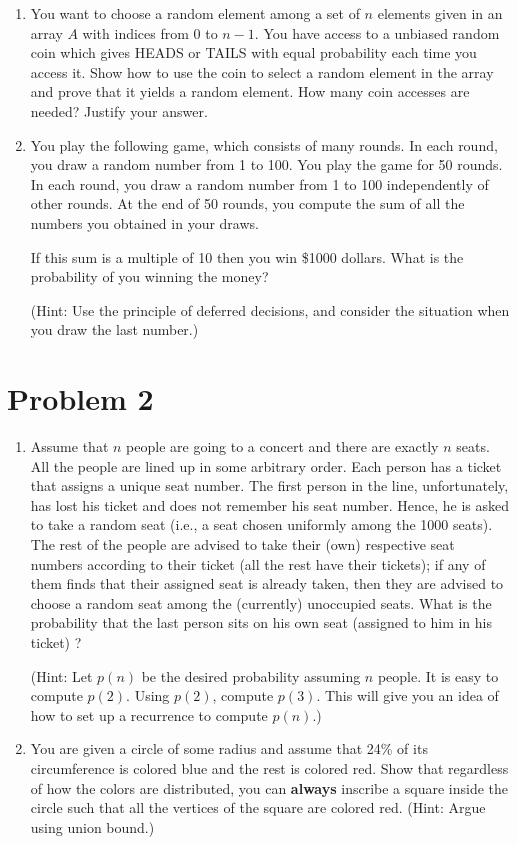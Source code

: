 \documentclass[11pt]{article}
\begin{document}
\begin{enumerate}
\item You want to choose a random element among a set of $n$  elements given in an array $A$ with indices from 
0 to $n-1$. You have access to a unbiased random coin which gives HEADS or TAILS with equal probability each time you access it. Show how to use the coin
to select a random element in the array and prove that it yields a random element. How many coin accesses are needed? Justify your answer. 
\item You play the following game, which consists of many rounds. In each round, you draw a random number from 1 to 100.  
You play the game for 50 rounds. In each round, you draw a random number from 1 to 100 independently of other rounds. 
At the end of 50 rounds, you compute the sum of all the numbers you obtained in your draws.  

If this sum is a multiple of 10 then you win \$1000 dollars.  What is the probability of you winning the money?

(Hint: Use the principle of deferred decisions, and consider the situation when you draw the last number.) 
\end{enumerate}


\section*{Problem 2} 

\begin{enumerate}
\item Assume that $n$ people are going to a concert and there are  exactly $n$ seats. 
All the people are lined up in some arbitrary order.  Each person has a ticket that assigns
a unique seat number.
The first person in the line, unfortunately, has lost his ticket and does not remember his seat number.
Hence, he is asked to take a random seat (i.e., a seat chosen uniformly
among the 1000 seats). The rest of the people are advised to take their (own) respective seat numbers according
to their ticket (all the rest have their tickets); if any of them finds that their assigned seat is already taken, then they are advised to choose a random seat among the (currently) unoccupied seats. What is the probability that
the last person sits on his own seat (assigned to him in his ticket) ?


(Hint: Let $p(n)$ be the desired probability assuming $n$ people. It is easy to compute $p(2)$. Using $p(2)$, compute $p(3)$. This will give you an idea of how to  set up a recurrence to compute $p(n)$.)

\item You are given a circle of some radius and assume that 24\% of its circumference is colored blue
and the rest is colored red.  Show that regardless of how the colors are distributed, you can {\bf always}  inscribe a square inside the circle such that
all the vertices of the square are colored red.  (Hint: Argue using union bound.)
\end{enumerate}
\end{document}
